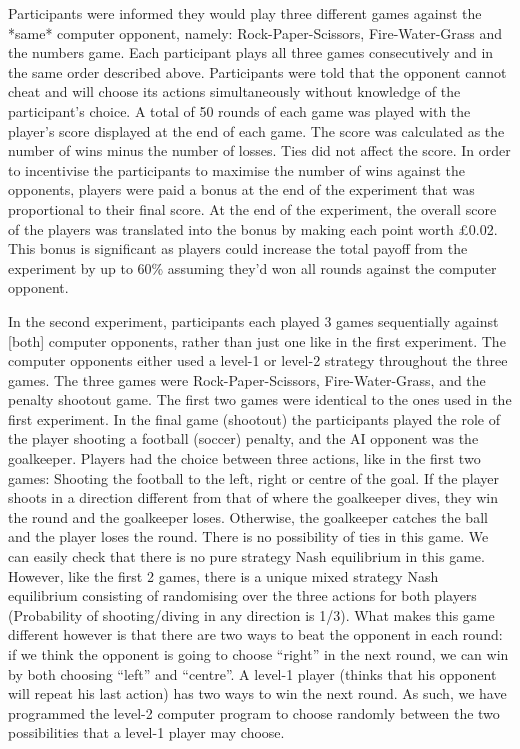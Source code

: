 \documentclass[12pt]{article}         %
\begin{document}
Participants were informed they would play three different games against the *same* computer opponent, namely: Rock-Paper-Scissors, Fire-Water-Grass and the numbers game. Each participant plays all three games consecutively and in the same order described above. Participants were told that the opponent cannot cheat and will choose its actions simultaneously without knowledge of the participant’s choice. A total of 50 rounds of each game was played with the player’s score displayed at the end of each game. The score was calculated as the number of wins minus the number of losses. Ties did not affect the score. In order to incentivise the participants to maximise the number of wins against the opponents, players were paid a bonus at the end of the experiment that was proportional to their final score. At the end of the experiment, the overall score of the players was translated into the bonus by making each point worth £0.02. This bonus is significant as players could increase the total payoff from the experiment by up to 60\% assuming they’d won all rounds against the computer opponent.


In the second experiment, participants  each played 3 games sequentially against [both] computer opponents, rather than just one like in the first experiment. The computer opponents either used a level-1 or level-2 strategy throughout the three games. The three games were Rock-Paper-Scissors, Fire-Water-Grass, and the penalty shootout game. The first two games were identical to the ones used in the first experiment. In the final game (shootout) the participants played the role of the player shooting a football (soccer) penalty, and the AI opponent was the goalkeeper. Players had the choice between three actions, like in the first two games: Shooting the football to the left, right or centre of the goal. If the player shoots in a direction different from that of where the goalkeeper dives, they win the round and the goalkeeper loses. Otherwise, the goalkeeper catches the ball and the player loses the round. There is no possibility of ties in this game. We can easily check that there is no pure strategy Nash equilibrium in this game. However, like the first 2 games, there is a unique mixed strategy Nash equilibrium consisting of randomising over the three actions for both players (Probability of shooting/diving in any direction is 1/3). What makes this game different however is that there are two ways to beat the opponent in each round: if we think the opponent is going to choose “right” in the next round, we can win by both choosing “left” and “centre”. A level-1 player (thinks that his opponent will repeat his last action) has two ways to win the next round. As such, we have programmed the level-2 computer program to choose randomly between the two possibilities that a level-1 player may choose.  
\end{document}

